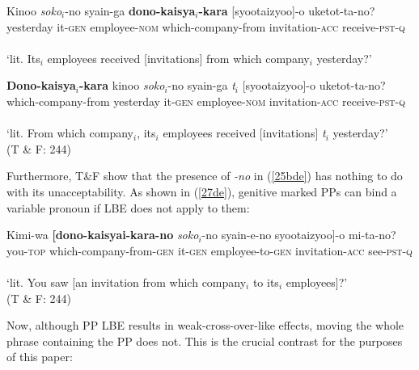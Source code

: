 \documentclass[
    output=paper,
    colorlinks,
    citecolor=brown,
]{langscibook}
\begin{document}
\begin{exe}
\ex \label{26de}
\begin{xlist}
\ex \label{26ade}
\gll *Kinoo \textit{soko}$_{i}$-no syain-ga           \textbf{ dono-kaisya$_{i}$-kara} [syootaizyoo]-o  uketot-ta-no?\\ 
yesterday it-\textsc{gen} employee-\textsc{nom} which-company-from invitation-\textsc{acc} receive-\textsc{pst}-\textsc{q}\\\\
`lit. Its$_{i}$ employees received [invitations] from which company$_{i}$ yesterday?’


\ex \label{26bde}
\gll \textbf{Dono-kaisya$_{i}$-kara} kinoo       \textit{soko}$_{i}$-no syain-ga \textit{t}$_{i}$  [syootaizyoo]-o uketot-ta-no?\\
which-company-from yesterday it-\textsc{gen} employee-\textsc{nom} {} invitation-\textsc{acc} receive-\textsc{pst}-\textsc{q}\\\\
‘lit. From which company$_{i}$, its$_{i}$ employees received [invitations] \textit{t}$_{i}$ yesterday?’\\
\hspace{79mm} (T \& F: 244)	

\end{xlist}
\end{exe}

Furthermore, T\&F show that the presence of \textit{-no} in (\ref{25bde}) has nothing to do with its unacceptability. As shown in (\ref{27de}), genitive marked PPs can bind a variable pronoun if LBE does not apply to them: 

\begin{exe}
\ex \label{27de}
\gll Kimi-wa \textbf{[dono-kaisyai-kara-no} \textit{soko}$_{i}$-no syain-e-no syootaizyoo]-o mi-ta-no?\\
you-\textsc{top} which-company-from-\textsc{gen} it-\textsc{gen} employee-to-\textsc{gen} invitation-\textsc{acc} see-\textsc{pst}-\textsc{q}\\\\
‘lit. You saw [an invitation from which company$_{i}$ to its$_{i}$ employees]?’\\
\hspace{82mm} (T \& F: 244)	
\end{exe}

Now, although PP LBE results in weak-cross-over-like effects, moving the whole phrase containing the PP does not. This is the crucial contrast for the purposes of this paper:
\end{document}

